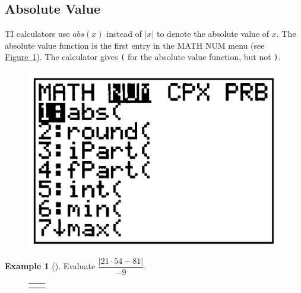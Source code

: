 \documentclass[10pt,]{book}
\theoremstyle{plain}
\theoremstyle{definition}
\theoremstyle{definition}
\newtheorem{example}[theorem]{Example}
\theoremstyle{definition}
\numberwithin{equation}{part}
\newlength{\panelmax}
\newcommand\abs[1]{\left|#1\right|}
\begin{document}
\subsection[{Absolute Value}]{Absolute Value}\label{subsection-70}
TI calculators use \(abs (x)\) instead of \(\abs{x}\) to denote the absolute value of \(x\). The absolute value function is the first entry in the MATH NUM menu (see \hyperref[fig-GC-settings3]{Figure~\ref{fig-GC-settings3}}). The calculator gives \lstinline?(? for the absolute value function, but not \lstinline?)?. \leavevmode%
\begin{figure}
\centering
\includegraphics[width=0.4\linewidth]{images/fig-GC-settings3.jpg}
\caption{\label{fig-GC-settings3}}
\end{figure}
%
\begin{example}[]\label{example-108}
Evaluate \(\dfrac{\abs{21\cdot 54 - 81}}{-9} \).%
{%
\setlength{\panelmax}{0pt}
\newsavebox{\panelboxAJOp}
\newlength{\phAJOp}\setlength{\phAJOp}{\ht\panelboxAJOp+\dp\panelboxAJOp}
\settototalheight{\phAJOp}{\usebox{\panelboxAJOp}}
\setlength{\panelmax}{\maxof{\panelmax}{\phAJOp}}
\newsavebox{\panelboxAJPp}
\newlength{\phAJPp}\setlength{\phAJPp}{\ht\panelboxAJPp+\dp\panelboxAJPp}
\settototalheight{\phAJPp}{\usebox{\panelboxAJPp}}
\setlength{\panelmax}{\maxof{\panelmax}{\phAJPp}}
\leavevmode%
\setlength{\tabcolsep}{0.025\textwidth}
\begin{figure}
\begin{tabular}{@{}*{2}{c}@{}}
\begin{minipage}[c][\panelmax][t]{0.65\textwidth}\usebox{\panelboxAJOp}\end{minipage}&
\begin{minipage}[c][\panelmax][t]{0.3\textwidth}\usebox{\panelboxAJPp}\end{minipage}\end{tabular}
\end{figure}
}%
\end{example}
\typeout{************************************************}
\typeout{************************************************}
\end{document}
